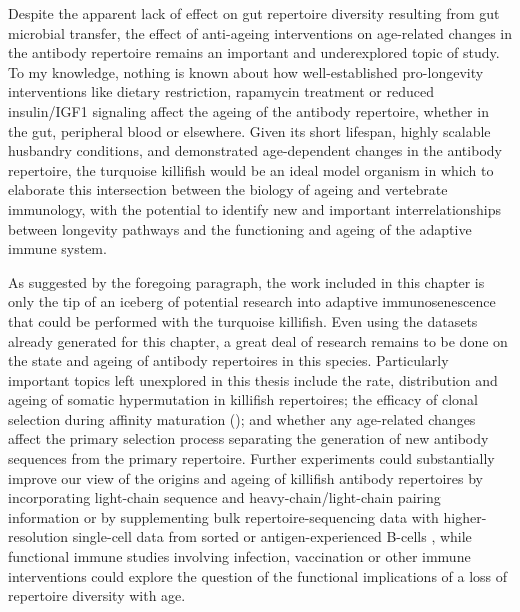 Despite the apparent lack of effect on gut repertoire diversity resulting from gut microbial transfer, the effect of anti-ageing interventions on age-related changes in the antibody repertoire remains an important and underexplored topic of study. To my knowledge, nothing is known about how well-established pro-longevity interventions like dietary restriction, rapamycin treatment or reduced insulin/IGF1 signaling \parencite{lopezotin2013hallmarks} affect the ageing of the antibody repertoire, whether in the gut, peripheral blood or elsewhere. Given its short lifespan, highly scalable husbandry conditions, and demonstrated age-dependent changes in the antibody repertoire, the turquoise killifish would be an ideal model organism in which to elaborate this intersection between the biology of ageing and vertebrate immunology, with the potential to identify new and important interrelationships between longevity pathways and the functioning and ageing of the adaptive immune system.

As suggested by the foregoing paragraph, the work included in this chapter is only the tip of an iceberg of potential research into adaptive immunosenescence that could be performed with the turquoise killifish. Even using the datasets already generated for this chapter, a great deal of research remains to be done on the state and ageing of antibody repertoires in this species. Particularly important topics left unexplored in this thesis include the rate, distribution and ageing of somatic hypermutation in killifish repertoires; the efficacy of clonal selection during affinity maturation (); and whether any age-related changes affect the primary selection process separating the generation of new antibody sequences from the primary \naive repertoire. Further experiments could substantially improve our view of the origins and ageing of killifish antibody repertoires by incorporating light-chain sequence and heavy-chain/light-chain pairing information or by supplementing bulk repertoire-sequencing data with higher-resolution single-cell data from sorted \naive or antigen-experienced B-cells \parencite{friedensohn2017advanced}, while functional immune studies involving infection, vaccination or other immune interventions could explore the question of the functional implications of a loss of repertoire diversity with age.

